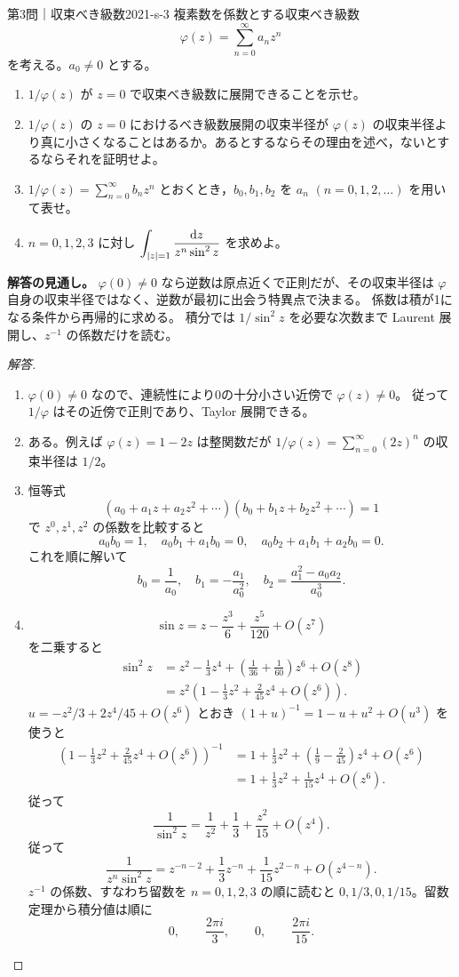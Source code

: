 \begin{problem}{第3問｜収束べき級数}{2021-s-3}
複素数を係数とする収束べき級数
\[
\varphi(z)=\sum_{n=0}^\infty a_nz^n
\]
を考える。$a_0\ne0$ とする。
\begin{enumerate}
  \item[(1)] $1/\varphi(z)$ が $z=0$ で収束べき級数に展開できることを示せ。
  \item[(2)] $1/\varphi(z)$ の $z=0$ におけるべき級数展開の収束半径が $\varphi(z)$ の収束半径より真に小さくなることはあるか。あるとするならその理由を述べ，ないとするならそれを証明せよ。
  \item[(3)] $1/\varphi(z)=\sum_{n=0}^\infty b_nz^n$ とおくとき，$b_0,b_1,b_2$ を $a_n$ $(n=0,1,2,\ldots)$ を用いて表せ。
  \item[(4)] $n=0,1,2,3$ に対し $\displaystyle\int_{|z|=1}\frac{\mathrm{d} z}{z^n\sin^2z}$ を求めよ。
\end{enumerate}
\end{problem}
\begin{memo*}
\textbf{解答の見通し。}
$\varphi(0)\ne0$ なら逆数は原点近くで正則だが、その収束半径は
$\varphi$ 自身の収束半径ではなく、逆数が最初に出会う特異点で決まる。
係数は積が1になる条件から再帰的に求める。
積分では $1/\sin^2z$ を必要な次数まで Laurent 展開し、$z^{-1}$ の係数だけを読む。
\end{memo*}
\begin{proof}[解答]
\begin{enumerate}
\item[(1)] $\varphi(0)\ne0$ なので、連続性により0の十分小さい近傍で $\varphi(z)\ne0$。
従って $1/\varphi$ はその近傍で正則であり、Taylor 展開できる。
\item[(2)] ある。例えば $\varphi(z)=1-2z$ は整関数だが
$1/\varphi(z)=\sum_{n=0}^\infty(2z)^n$ の収束半径は $1/2$。
\item[(3)] 恒等式
\[
(a_0+a_1z+a_2z^2+\cdots)(b_0+b_1z+b_2z^2+\cdots)=1
\]
で $z^0,z^1,z^2$ の係数を比較すると
\[
a_0b_0=1,\quad a_0b_1+a_1b_0=0,\quad
a_0b_2+a_1b_1+a_2b_0=0.
\]
これを順に解いて
\[
b_0=\frac1{a_0},\quad b_1=-\frac{a_1}{a_0^2},\quad
b_2=\frac{a_1^2-a_0a_2}{a_0^3}.
\]
\item[(4)]
\[
\sin z=z-\frac{z^3}{6}+\frac{z^5}{120}+O(z^7)
\]
を二乗すると
\begin{align*}
\sin^2z
&=z^2-\frac13z^4
+\left(\frac1{36}+\frac1{60}\right)z^6+O(z^8)\\
&=z^2\left(1-\frac13z^2+\frac{2}{45}z^4+O(z^6)\right).
\end{align*}
$u=-z^2/3+2z^4/45+O(z^6)$ とおき
$(1+u)^{-1}=1-u+u^2+O(u^3)$ を使うと
\begin{align*}
\left(1-\frac13z^2+\frac{2}{45}z^4+O(z^6)\right)^{-1}
&=1+\frac13z^2
+\left(\frac19-\frac{2}{45}\right)z^4+O(z^6)\\
&=1+\frac13z^2+\frac1{15}z^4+O(z^6).
\end{align*}
従って
\[
\frac1{\sin^2z}=\frac1{z^2}+\frac13+\frac{z^2}{15}+O(z^4).
\]
従って
\[
\frac1{z^n\sin^2z}
=z^{-n-2}+\frac13z^{-n}+\frac1{15}z^{2-n}+O(z^{4-n}).
\]
$z^{-1}$ の係数、すなわち留数を $n=0,1,2,3$ の順に読むと
$0,1/3,0,1/15$。留数定理から積分値は順に
\[
0,\qquad \frac{2\pi i}{3},\qquad0,\qquad\frac{2\pi i}{15}.
\]
\end{enumerate}
\end{proof}

